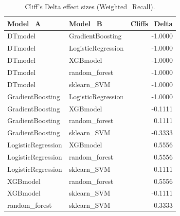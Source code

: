 \begin{table}[t]
\centering
\begin{tabular}{llr}
\toprule
Model_A & Model_B & Cliffs_Delta \\
\midrule
DTmodel & GradientBoosting & -1.0000 \\
DTmodel & LogisticRegression & -1.0000 \\
DTmodel & XGBmodel & -1.0000 \\
DTmodel & random_forest & -1.0000 \\
DTmodel & sklearn_SVM & -1.0000 \\
GradientBoosting & LogisticRegression & -1.0000 \\
GradientBoosting & XGBmodel & -0.1111 \\
GradientBoosting & random_forest & 0.1111 \\
GradientBoosting & sklearn_SVM & -0.3333 \\
LogisticRegression & XGBmodel & 0.5556 \\
LogisticRegression & random_forest & 0.5556 \\
LogisticRegression & sklearn_SVM & 0.1111 \\
XGBmodel & random_forest & 0.5556 \\
XGBmodel & sklearn_SVM & -0.1111 \\
random_forest & sklearn_SVM & -0.3333 \\
\bottomrule
\end{tabular}
\caption{Cliff's Delta effect sizes (Weighted_Recall).}
\label{tab:cliffs_Weighted_Recall}
\end{table}